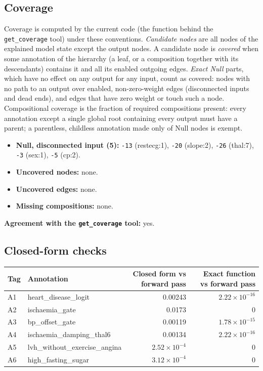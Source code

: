 \begin{drafted}
\subsection{Coverage}\label{app:heart-s5-c2:coverage}
Coverage is computed by the current code (the function behind the \texttt{get\_coverage} tool) under these conventions. \emph{Candidate nodes} are all nodes of the explained model state except the output nodes. A candidate node is \emph{covered} when some annotation of the hierarchy (a leaf, or a composition together with its descendants) contains it and all its enabled outgoing edges. \emph{Exact Null} parts, which have no effect on any output for any input, count as covered: nodes with no path to an output over enabled, non-zero-weight edges (disconnected inputs and dead ends), and edges that have zero weight or touch such a node. Compositional coverage is the fraction of required compositions present: every annotation except a single global root containing every output must have a parent; a parentless, childless annotation made only of Null nodes is exempt.

\begin{itemize}
\item \textbf{Null, disconnected input (5):} \texttt{-13} (restecg:1), \texttt{-20} (slope:2), \texttt{-26} (thal:7), \texttt{-3} (sex:1), \texttt{-5} (cp:2).
\item \textbf{Uncovered nodes:} none.
\item \textbf{Uncovered edges:} none.
\item \textbf{Missing compositions:} none.
\end{itemize}
\noindent\textbf{Agreement with the \texttt{get\_coverage} tool:} yes.

\subsection{Closed-form checks}\label{app:heart-s5-c2:closedform}
{\small\noindent\begin{tabularx}{\linewidth}{@{}lXrr@{}}
\toprule Tag & Annotation & Closed form vs forward pass & Exact function vs forward pass \\ \midrule
A1 & heart\_\allowbreak{}disease\_\allowbreak{}logit & 0.00243 & $2.22\times 10^{-16}$ \\
A2 & ischaemia\_\allowbreak{}gate & 0.0173 & 0 \\
A3 & bp\_\allowbreak{}offset\_\allowbreak{}gate & 0.00119 & $1.78\times 10^{-15}$ \\
A4 & ischaemia\_\allowbreak{}damping\_\allowbreak{}thal6 & 0.00134 & $2.22\times 10^{-16}$ \\
A5 & lvh\_\allowbreak{}without\_\allowbreak{}exercise\_\allowbreak{}angina & $2.52\times 10^{-4}$ & 0 \\
A6 & high\_\allowbreak{}fasting\_\allowbreak{}sugar & $3.12\times 10^{-4}$ & 0 \\
\bottomrule
\end{tabularx}\par}

\end{drafted}
